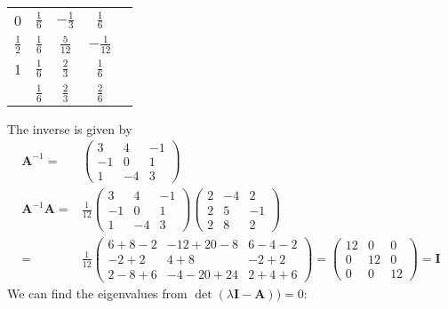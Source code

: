 \documentclass[10pt,a4paper]{article}
\newcommand{\half}[0]{\frac{1}{2}}
\newcommand{\bvec}[1]{\mathbf{#1}}
\begin{document}
\begin{table}[h]
  \centering
  \begin{tabular}{c|cccc}
    0 & $\frac{1}{6}$ & $-\frac{1}{3} $ & $\frac{1}{6}$ \\
    $\half$ & $\frac{1}{6}$ & $\frac{5}{12}$ & $-\frac{1}{12}$ \\
    1 & $\frac{1}{6}$ & $\frac{2}{3}$ &  $\frac{1}{6}$ \\ \hline
    {} & $\frac{1}{6}$ & $\frac{2}{3}$ & $\frac{2}{6}$
  \end{tabular}
\end{table}
The inverse is given by
\begin{align*}
  \bvec{A}^{-1} =& \begin{pmatrix}
     3 &  4 & -1 \\
    -1 &  0 &  1 \\
     1 & -4 &  3
  \end{pmatrix} \\
  \bvec{A}^{-1}\bvec{A} =& \frac{1}{12} \begin{pmatrix}
     3 &  4 & -1 \\
    -1 &  0 &  1 \\
     1 & -4 &  3
  \end{pmatrix} \begin{pmatrix}
    2 & -4 & 2 \\
    2 & 5 & -1 \\
    2 & 8 & 2
  \end{pmatrix} \\
  =& \frac{1}{12}\begin{pmatrix}
    6 + 8 - 2 & -12 + 20 - 8 & 6 - 4 - 2 \\
    -2 + 2 & 4 + 8 & -2 + 2 \\
    2 - 8 + 6 & -4 - 20 + 24 & 2 + 4 + 6
  \end{pmatrix} = \begin{pmatrix}
    12 & 0 & 0 \\
    0 & 12 & 0 \\
    0 & 0 & 12
  \end{pmatrix} = \bvec{I}
\end{align*}
We can find the eigenvalues from $\det (\lambda \bvec{I} - \bvec{A})) = 0:$
\end{document}
